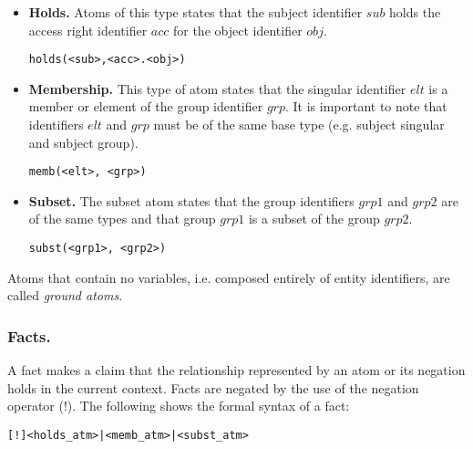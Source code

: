 \documentclass[11pt]{llncs}
\begin{document}
        \begin{itemize}
          \item
            {\bf Holds.} Atoms of this type states that the subject
            identifier $sub$ holds the access right identifier $acc$ for the
            object identifier $obj$.

            \begin{verbatim}holds(<sub>,<acc>.<obj>)\end{verbatim}

          \vspace{1mm}
          \item
            {\bf Membership.} This type of atom states that the singular
            identifier $elt$ is a member or element of the group identifier
            $grp$. It is important to note that identifiers $elt$ and $grp$
            must be of the same base type (e.g. subject singular and subject
            group).

            \begin{verbatim}memb(<elt>, <grp>)\end{verbatim}

          \vspace{1mm}
          \item
            {\bf Subset.} The subset atom states that the group identifiers
            $grp1$ and $grp2$ are of the same types and that group $grp1$ is
            a subset of the group $grp2$.

            \begin{verbatim}subst(<grp1>, <grp2>)\end{verbatim}
        \end{itemize}

        Atoms that contain no variables, i.e. composed entirely of entity
        identifiers, are called {\em ground atoms}.

      \subsubsection{Facts.}

        A fact makes a claim that the relationship represented by an atom or
        its negation holds in the current context. Facts are negated by the
        use of the negation operator ($!$). The following shows the formal
        syntax of a fact:

        \begin{verbatim}[!]<holds_atm>|<memb_atm>|<subst_atm>\end{verbatim}
\end{document}
